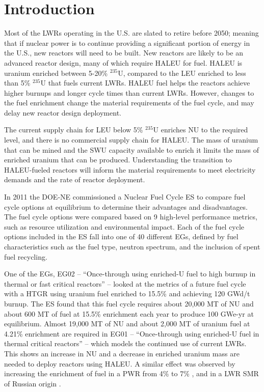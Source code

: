 \section{Introduction}

Most of the \glspl{LWR} operating in the U.S. are slated to retire
before 2050; meaning that if nuclear power is to continue providing a 
significant portion of energy in the U.S., new reactors will need to be built. 
New reactors are likely to be an advanced reactor design, many of 
which require \gls{HALEU} for fuel. \gls{HALEU} is uranium  
enriched between 5-20\% $^{235}$U, compared to the \gls{LEU} enriched to 
less than 5\% $^{235}$U that fuels current \glspl{LWR}. \gls{HALEU} fuel helps 
the reactors achieve higher burnups and longer cycle times than current 
\glspl{LWR}. However, changes to the fuel enrichment change the material 
requirements of the fuel cycle, and may delay 
new reactor design deployment.

The current supply chain for \gls{LEU} below 5\% $^{235}$U 
enriches \gls{NU} to the required level, and there is no commercial 
supply chain for \gls{HALEU}.  
The mass of uranium that can be mined and the \gls{SWU} capacity available 
to enrich it limits the mass of enriched uranium that can be 
produced. Understanding 
the transition to \gls{HALEU}-fueled reactors will inform the material 
requirements to meet electricity demands and 
the rate of reactor deployment.

In 2011 the \gls{DOE-NE} commissioned a Nuclear Fuel Cycle \gls{ES} 
\cite{wigeland_nuclear_2014} to compare fuel cycle options at equilibrium
to determine their advantages and disadvantages. The fuel cycle options were 
compared 
based on 9 high-level performance metrics, such as resource utilization and 
environmental impact. Each of the fuel cycle options included in the 
\gls{ES} fall into one of 40 different \glspl{EG}, defined by fuel 
characteristics such as the fuel type, neutron spectrum, and the inclusion 
of spent fuel recycling. 

One of the \glspl{EG}, \gls{EG}02 -- ``Once-through using enriched-U fuel to 
high burnup in thermal or fast critical reactors'' -- looked at the metrics 
of a future fuel cycle with a \gls{HTGR} using uranium fuel enriched to 
15.5\% and achieving 120 GWd/t burnup. The \gls{ES} found that this fuel cycle
requires about 20,000 MT of \gls{NU} and about 600 MT of fuel at 15.5\% 
enrichment each year 
to produce 100 GWe-yr at equilibrium. Almost 19,000 MT of \gls{NU} and 
about 2,000 MT of uranium fuel at 4.21\%
enrichment are required in \gls{EG}01 -- ``Once-through using enriched-U 
fuel in thermal critical reactors'' -- which models the continued use of current 
\glspl{LWR}. This shows an increase in \gls{NU} and a decrease in enriched uranium 
mass are needed to deploy reactors using \gls{HALEU}.
A similar effect was observed by increasing the enrichment of fuel in a 
\gls{PWR} from 4\% to 7\% \cite{burns_reactor_2020}, and in a \gls{LWR}
\gls{SMR} of Russian origin \cite{hernandez_potential_2020}. 

